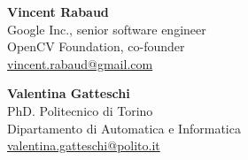 \textbf{Vincent Rabaud}\\
Google Inc., senior software engineer\\
OpenCV Foundation, co-founder\\
\href{mailto:vincent.rabaud@gmail.com}{vincent.rabaud@gmail.com}

\textbf{Valentina Gatteschi}\\
PhD. Politecnico di Torino\\
Dipartamento di Automatica e Informatica\\
\href{mailto:valentina.gatteschi@polito.it}{valentina.gatteschi@polito.it}

